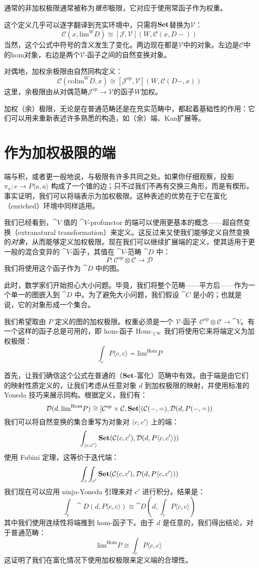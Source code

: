 \documentclass[DaoFP]{subfiles}
\begin{document}
通常的非加权极限通常被称为\emph{锥形}极限，它对应于使用常函子作为权重。

这个定义几乎可以逐字翻译到充实环境中，只需将$\mathbf{Set}$替换为$\mathcal V$：
\[  \mathcal C(x, \text{lim}^W D) \cong [\mathcal J, \mathcal V] (W, \mathcal C(x, D-)) \]
当然，这个公式中符号的含义发生了变化。两边现在都是$\mathcal V$中的对象。左边是$\mathcal C$中的hom对象，右边是两个$\mathcal V$-函子之间的自然变换对象。

对偶地，加权余极限由自然同构定义：
\[  \mathcal C(\text{colim}^W D, x) \cong [\mathcal J^{op}, \mathcal V] (W, \mathcal C(D-, x)) \]
这里，余极限由从对偶范畴$\mathcal J^{op} \to \mathcal V$的函子$W$加权。

加权（余）极限，无论是在普通范畴还是在充实范畴中，都起着基础性的作用：它们可以用来重新表述许多熟悉的构造，如（余）端、Kan扩展等。

\section{作为加权极限的端}

端与积，或者更一般地说，与极限有许多共同之处。如果你仔细观察，投影 $\pi_x \colon e \to P \langle a, a \rangle$ 构成了一个锥的边；只不过我们不再有交换三角形，而是有楔形。事实证明，我们可以将端表示为加权极限。这种表述的优势在于它在富化（enriched）环境中同样适用。

我们已经看到，$\cat V$ 值的 $\cat V$-profunctor 的端可以使用更基本的概念——超自然变换（extranatural transformation）来定义。这反过来又使我们能够定义自然变换的\emph{对象}，从而能够定义加权极限。现在我们可以继续扩展端的定义，使其适用于更一般的混合变异的 $\cat V$-函子，其值在 $\cat V$-范畴 $\cat D$ 中：
\[ P \colon \mathcal C^{op} \otimes \mathcal C \to \mathcal D \]
我们将使用这个函子作为 $\cat D$ 中的图。

此时，数学家们开始担心大小问题。毕竟，我们将整个范畴——平方后——作为一个单一的图嵌入到 $\cat D$ 中。为了避免大小问题，我们假设 $\cat C$ 是小的；也就是说，它的对象形成一个集合。

我们希望取由 $P$ 定义的图的加权极限。权重必须是一个 $\mathcal V$-函子 $\mathcal C^{op} \otimes \mathcal C \to \cat V$。有一个这样的函子总是可用的，即 hom-函子 $\text{Hom}_{\cat C}$。我们将使用它来将端定义为加权极限：
\[  \int_c P\langle c, c\rangle = \text{lim}^{\text{Hom}} P\]

首先，让我们确信这个公式在普通的（$\mathbf{Set}$-富化）范畴中有效。由于端是由它们的映射性质定义的，让我们考虑从任意对象 $d$ 到加权极限的映射，并使用标准的 Yoneda 技巧来展示同构。根据定义，我们有：
\[ \mathcal{D}(d, \text{lim}^{\text{Hom}} P) \cong [\mathcal{C}^{op} \times \mathcal{C}, \mathbf{Set}](\mathcal{C}(-, =), \mathcal{D} (d, P(-, =))\]
我们可以将自然变换的集合重写为对象对 $\langle c, c' \rangle$ 上的端：
\[ \int_{\langle c, c' \rangle} \mathbf{Set}(\mathcal{C}(c, c'), \mathcal{D} (d, P\langle c, c' \rangle)) \]
使用 Fubini 定理，这等价于迭代端：
\[\int_c \int_{c'} \mathbf{Set}(\mathcal{C}(c, c'), \mathcal{D}(d, P\langle c, c' \rangle))\]
我们现在可以应用 ninja-Yoneda 引理来对 $c'$ 进行积分。结果是：
\[ \int_c \cat D(d, P\langle c, c \rangle) \cong \cat D(d, \int_c P \langle c, c \rangle) \]
其中我们使用连续性将端推到 hom-函子下。由于 $d$ 是任意的，我们得出结论，对于普通范畴：
\[ \text{lim}^{\text{Hom}} P \cong  \int_c P\langle c, c\rangle \]
这证明了我们在富化情况下使用加权极限来定义端的合理性。
\end{document}
